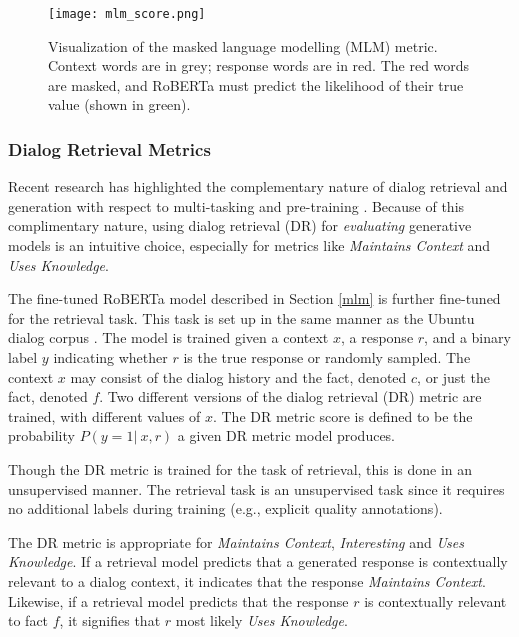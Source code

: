\documentclass[11pt,a4paper]{article}
\begin{document}
\begin{figure}
    \centering
    \texttt{[image: mlm\_score.png]}
    \caption{Visualization of the masked language modelling (MLM) metric. Context words are in grey; response words are in red. The red words are masked, and RoBERTa must predict the likelihood of their true value (shown in green).}
    \label{fig:mlm_score}
\end{figure}


\subsubsection{Dialog Retrieval Metrics}

Recent research has highlighted the complementary nature of dialog retrieval and generation with respect to multi-tasking \citep{wolf2019transfertransfo} and pre-training \citep{mehri2019pretraining}. Because of this complimentary nature, using dialog retrieval (DR) for \textit{evaluating} generative models is an intuitive choice, especially for metrics like \textit{Maintains Context} and \textit{Uses Knowledge}.

The fine-tuned RoBERTa model described in Section \ref{mlm} is further fine-tuned for the retrieval task. This task is set up in the same manner as the Ubuntu dialog corpus \citep{lowe2015ubuntu}. The model is trained given a context $x$, a response $r$, and a binary label $y$ indicating whether $r$ is the true response or randomly sampled. The context $x$ may consist of the dialog history and the fact, denoted $c$, or just the fact, denoted $f$. Two different versions of the dialog retrieval (DR) metric are trained, with different values of $x$. The DR metric score is defined to be the probability $P(y = 1 | ~x, r)$ a given DR metric model produces. 

Though the DR metric is trained for the task of retrieval, this is done in an unsupervised manner. The retrieval task is an unsupervised task since it requires no additional labels during training (e.g., explicit quality annotations).


The DR metric is appropriate for \textit{Maintains Context}, \textit{Interesting} and \textit{Uses Knowledge}. If a retrieval model predicts that a generated response is contextually relevant to a dialog context, it indicates that the response \textit{Maintains Context}. Likewise, if a retrieval model predicts that the response $r$ is contextually relevant to fact $f$, it signifies that $r$ most likely \textit{Uses Knowledge}. 
\end{document}

